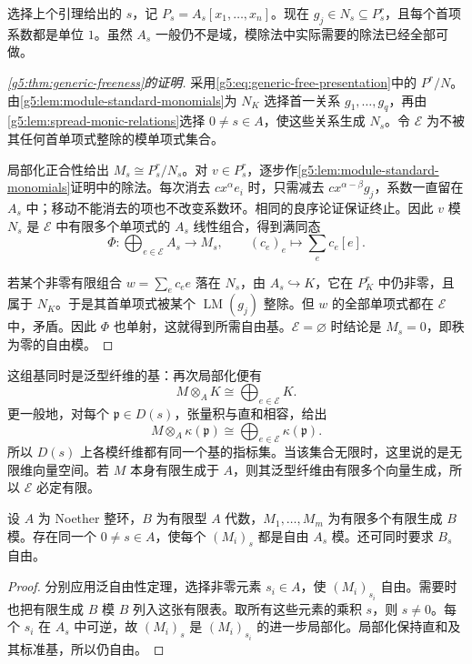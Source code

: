 选择上个引理给出的 \(s\)，记 \(P_s=A_s[x_1,\ldots,x_n]\)。现在 \(g_j\in N_s\subseteq P_s^r\)，且每个首项系数都是单位 \(1\)。虽然 \(A_s\) 一般仍不是域，模除法中实际需要的除法已经全部可做。

\begin{proof}[\cref{g5:thm:generic-freeness}的证明]
	采用\eqref{g5:eq:generic-free-presentation}中的 \(P^r/N\)。由\cref{g5:lem:module-standard-monomials}为 \(N_K\) 选择首一关系 \(g_1,\ldots,g_q\)，再由\cref{g5:lem:spread-monic-relations}选择 \(0\ne s\in A\)，使这些关系生成 \(N_s\)。令 \(\mathcal E\) 为不被其任何首单项式整除的模单项式集合。

	局部化正合性给出 \(M_s\cong P_s^r/N_s\)。对 \(v\in P_s^r\)，逐步作\cref{g5:lem:module-standard-monomials}证明中的除法。每次消去 \(cx^\alpha e_i\) 时，只需减去 \(cx^{\alpha-\beta}g_j\)，系数一直留在 \(A_s\) 中；移动不能消去的项也不改变系数环。相同的良序论证保证终止。因此 \(v\) 模 \(N_s\) 是 \(\mathcal E\) 中有限多个单项式的 \(A_s\) 线性组合，得到满同态
	\[
		\Phi:\bigoplus_{e\in\mathcal E}A_s\longrightarrow M_s,
		\qquad (c_e)_e\longmapsto\sum_e c_e[e].
	\]

	若某个非零有限组合 \(w=\sum_e c_e e\) 落在 \(N_s\)，由 \(A_s\hookrightarrow K\)，它在 \(P_K^r\) 中仍非零，且属于 \(N_K\)。于是其首单项式被某个 \(\operatorname{LM}(g_j)\) 整除。但 \(w\) 的全部单项式都在 \(\mathcal E\) 中，矛盾。因此 \(\Phi\) 也单射，这就得到所需自由基。\(\mathcal E=\varnothing\) 时结论是 \(M_s=0\)，即秩为零的自由模。
\end{proof}

这组基同时是泛型纤维的基：再次局部化便有
\[
	M\otimes_A K\cong\bigoplus_{e\in\mathcal E}K.
\]
更一般地，对每个 \(\mathfrak p\in D(s)\)，张量积与直和相容，给出
\[
	M\otimes_A\kappa(\mathfrak p)
	\cong\bigoplus_{e\in\mathcal E}\kappa(\mathfrak p).
\]
所以 \(D(s)\) 上各模纤维都有同一个基的指标集。当该集合无限时，这里说的是无限维向量空间。若 \(M\) 本身有限生成于 \(A\)，则其泛型纤维由有限多个向量生成，所以 \(\mathcal E\) 必定有限。

\begin{corollary}\label{g5:cor:simultaneous-generic-freeness}
	设 \(A\) 为 Noether 整环，\(B\) 为有限型 \(A\) 代数，\(M_1,\ldots,M_m\) 为有限多个有限生成 \(B\) 模。存在同一个 \(0\ne s\in A\)，使每个 \((M_i)_s\) 都是自由 \(A_s\) 模。还可同时要求 \(B_s\) 自由。
\end{corollary}
\begin{proof}
	分别应用泛自由性定理，选择非零元素 \(s_i\in A\)，使 \((M_i)_{s_i}\) 自由。需要时也把有限生成 \(B\) 模 \(B\) 列入这张有限表。取所有这些元素的乘积 \(s\)，则 \(s\ne0\)。每个 \(s_i\) 在 \(A_s\) 中可逆，故 \((M_i)_s\) 是 \((M_i)_{s_i}\) 的进一步局部化。局部化保持直和及其标准基，所以仍自由。
\end{proof}

